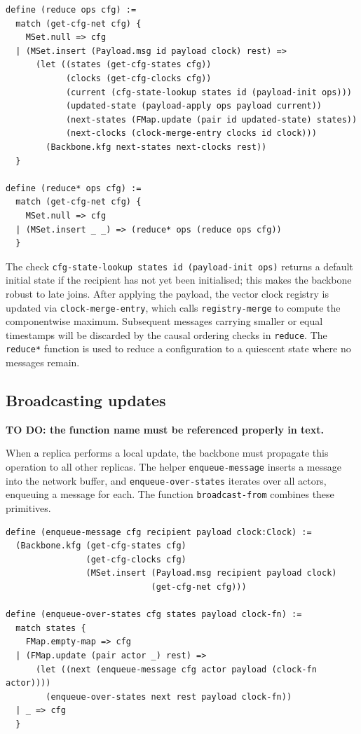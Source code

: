 \begin{lstlisting}[language=Athena,style=athena]
define (reduce ops cfg) :=
  match (get-cfg-net cfg) {
    MSet.null => cfg
  | (MSet.insert (Payload.msg id payload clock) rest) =>
      (let ((states (get-cfg-states cfg))
            (clocks (get-cfg-clocks cfg))
            (current (cfg-state-lookup states id (payload-init ops)))
            (updated-state (payload-apply ops payload current))
            (next-states (FMap.update (pair id updated-state) states))
            (next-clocks (clock-merge-entry clocks id clock)))
        (Backbone.kfg next-states next-clocks rest))
  }

define (reduce* ops cfg) :=
  match (get-cfg-net cfg) {
    MSet.null => cfg
  | (MSet.insert _ _) => (reduce* ops (reduce ops cfg))
  }
\end{lstlisting}

The check \lstinline{cfg-state-lookup states id (payload-init ops)} returns a default initial state if the recipient has not yet been initialised;  
this makes the backbone robust to late joins.  
After applying the payload, the vector clock registry is updated via \lstinline{clock-merge-entry}, which calls \lstinline{registry-merge} to compute the componentwise maximum.  
Subsequent messages carrying smaller or equal timestamps will be discarded by the causal ordering checks in \lstinline{reduce}.  
The \lstinline{reduce*} function is used to reduce a configuration to a quiescent state where no messages remain.

\subsection{Broadcasting updates}

\textbf{TO DO: the function name must be referenced properly in text.}

When a replica performs a local update, the backbone must propagate this operation to all other replicas.  
The helper \lstinline{enqueue-message} inserts a message into the network buffer, and \lstinline{enqueue-over-states} iterates over all actors, enqueuing a message for each.  
The function \lstinline{broadcast-from} combines these primitives.

\begin{lstlisting}[language=Athena,style=athena]
define (enqueue-message cfg recipient payload clock:Clock) :=
  (Backbone.kfg (get-cfg-states cfg)
                (get-cfg-clocks cfg)
                (MSet.insert (Payload.msg recipient payload clock) 
                             (get-cfg-net cfg)))

define (enqueue-over-states cfg states payload clock-fn) :=
  match states {
    FMap.empty-map => cfg
  | (FMap.update (pair actor _) rest) =>
      (let ((next (enqueue-message cfg actor payload (clock-fn actor))))
        (enqueue-over-states next rest payload clock-fn))
  | _ => cfg 
  }
\end{lstlisting}

